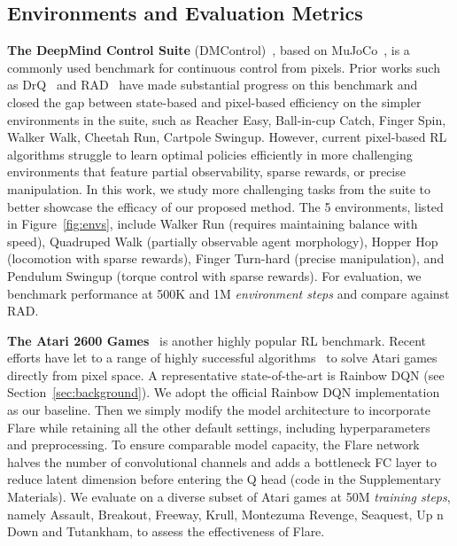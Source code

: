 \documentclass{article} \usepackage{iclr2021_conference,times}
\begin{document}
\subsection{Environments and Evaluation Metrics}\label{sec:dmcontrol}
    \textbf{The DeepMind Control Suite} (DMControl)~\citep{tassa2018deepmind}, based on MuJoCo~\citep{mujoco}, is a commonly used benchmark for continuous control from pixels.
Prior works such as DrQ~\citep{kostrikov2020image} and RAD~\citep{laskin_lee2020rad} have made substantial progress on this benchmark and closed the gap between state-based and pixel-based efficiency on the simpler environments in the suite, such as Reacher Easy, Ball-in-cup Catch, Finger Spin, Walker Walk, Cheetah Run, Cartpole Swingup. However, current pixel-based RL algorithms struggle to learn optimal policies efficiently in more challenging environments that feature partial observability, sparse rewards, or precise manipulation. In this work, we study more challenging tasks from the suite to better showcase the efficacy of our proposed method. The 5 environments, listed in Figure~\ref{fig:envs}, include Walker Run (requires maintaining balance with speed), Quadruped Walk (partially observable agent morphology), Hopper Hop (locomotion with sparse rewards), Finger Turn-hard (precise manipulation), and Pendulum Swingup (torque control with sparse rewards). For evaluation, we benchmark performance at 500K and 1M \emph{environment steps} and compare against RAD.
    
    \textbf{The Atari 2600 Games}~\citep{bellemare2013arcade} is another highly popular RL benchmark. Recent efforts have let to a range of highly successful algorithms~\citep{espeholt2018impala, hessel2017rainbow, kapturowski2018recurrent, hafner2019dream, agent57} to solve Atari games directly from pixel space. A representative state-of-the-art is Rainbow DQN (see Section~\ref{sec:background}). We adopt the official Rainbow DQN implementation~\citep{dqnzoo2020github} as our baseline. Then we simply modify the model architecture to incorporate Flare while retaining all the other default settings, including hyperparameters and preprocessing. To ensure comparable model capacity, the Flare network halves the number of convolutional channels and adds a bottleneck FC layer to reduce latent dimension before entering the Q head (code in the Supplementary Materials). We evaluate on a diverse subset of Atari games at 50M \emph{training steps}, namely Assault, Breakout, Freeway, Krull, Montezuma Revenge, Seaquest, Up n Down and Tutankham, to assess the effectiveness of Flare.
\fi
\end{document}
